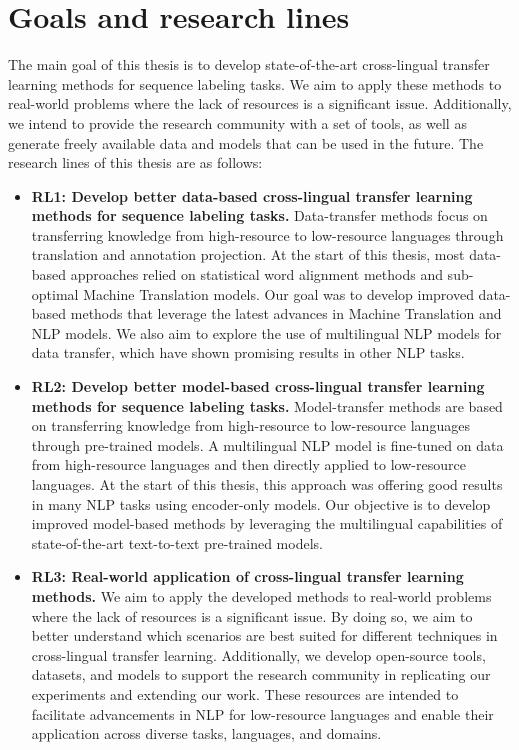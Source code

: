 \section{Goals and research lines}
\label{goals}

The main goal of this thesis is to develop state-of-the-art cross-lingual transfer learning methods for sequence labeling tasks. We aim to apply these methods to real-world problems where the lack of resources is a significant issue. Additionally, we intend to provide the research community with a set of tools, as well as generate freely available data and models that can be used in the future. The research lines of this thesis are as follows:

\begin{itemize}
    \item \textbf{RL1: Develop better data-based cross-lingual transfer learning methods for sequence labeling tasks.} Data-transfer methods focus on transferring knowledge from high-resource to low-resource languages through translation and annotation projection. At the start of this thesis, most data-based approaches relied on statistical word alignment methods and sub-optimal Machine Translation models. Our goal was to develop improved data-based methods that leverage the latest advances in Machine Translation and NLP models. We also aim to explore the use of multilingual NLP models for data transfer, which have shown promising results in other NLP tasks.
    
    \item \textbf{RL2: Develop better model-based cross-lingual transfer learning methods for sequence labeling tasks.} Model-transfer methods are based on transferring knowledge from high-resource to low-resource languages through pre-trained models. A multilingual NLP model is fine-tuned on data from high-resource languages and then directly applied to low-resource languages. At the start of this thesis, this approach was offering good results in many NLP tasks using encoder-only models. Our objective is to develop improved model-based methods by leveraging the multilingual capabilities of state-of-the-art text-to-text pre-trained models.
    
    \item \textbf{RL3: Real-world application of cross-lingual transfer learning methods.} We aim to apply the developed methods to real-world problems where the lack of resources is a significant issue. By doing so, we aim to better understand which scenarios are best suited for different techniques in cross-lingual transfer learning. Additionally, we develop open-source tools, datasets, and models to support the research community in replicating our experiments and extending our work. These resources are intended to facilitate advancements in NLP for low-resource languages and enable their application across diverse tasks, languages, and domains.

\end{itemize}
\clearpage
